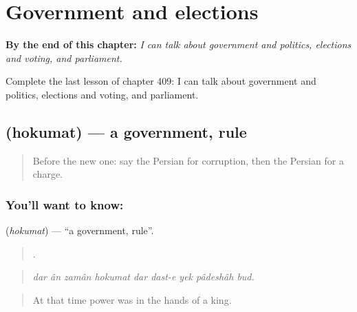 
\chapter{Government and elections}
\label{ch:fa-government-and-elections}

\begin{chapteropening}
\textbf{By the end of this chapter:} \emph{I can talk about government and politics, elections and voting, and parliament.}

Complete the last lesson of chapter 409: I can talk about government and politics, elections and voting, and parliament.
\end{chapteropening}

\section[\texorpdfstring{\fa{حکومت} (hokumat)}{حکومت (hokumat)}]{ (hokumat) — a government, rule}

\label{lesson:FA-C409-hokumat}



\begin{quote}
Before the new one: say the Persian for corruption, then the Persian for a charge.
\end{quote}

\subsection*{You'll want to know: }
\textbf{} (\emph{hokumat}) — \textquotedblleft{}a government, rule\textquotedblright{}.

\begin{quote}
        .
\end{quote}

\begin{quote}
\emph{dar ân zamân hokumat dar dast-e yek pâdeshâh bud.}
\end{quote}

\begin{quote}
At that time power was in the hands of a king.
\end{quote}

